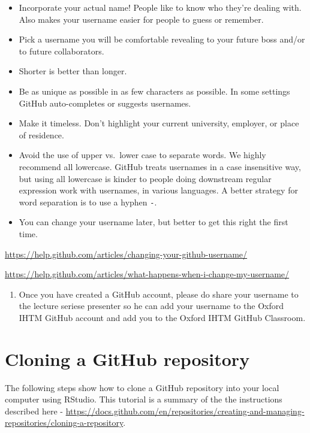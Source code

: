\documentclass[
  12pt,
]{book}
\providecommand{\tightlist}{%
  \setlength{\itemsep}{0pt}\setlength{\parskip}{0pt}}
\begin{document}
\begin{itemize}
\item
  Incorporate your actual name! People like to know who they're dealing with. Also makes your username easier for people to guess or remember.
\item
  Pick a username you will be comfortable revealing to your future boss and/or to future collaborators.
\item
  Shorter is better than longer.
\item
  Be as unique as possible in as few characters as possible. In some settings GitHub auto-completes or suggests usernames.
\item
  Make it timeless. Don't highlight your current university, employer, or place of residence.
\item
  Avoid the use of upper vs.~lower case to separate words. We highly recommend all lowercase. GitHub treats usernames in a case insensitive way, but using all lowercase is kinder to people doing downstream regular expression work with usernames, in various languages. A better strategy for word separation is to use a hyphen \texttt{-}.
\item
  You can change your username later, but better to get this right the first time.
\end{itemize}

\url{https://help.github.com/articles/changing-your-github-username/}

\url{https://help.github.com/articles/what-happens-when-i-change-my-username/}

\begin{enumerate}
\def\labelenumi{\arabic{enumi}.}
\setcounter{enumi}{5}
\tightlist
\item
  Once you have created a GitHub account, please do share your username to the lecture seriese presenter so he can add your username to the Oxford IHTM GitHub account and add you to the Oxford IHTM GitHub Classroom.
\end{enumerate}

\hypertarget{clone-repository}{%
\chapter{Cloning a GitHub repository}\label{clone-repository}}

The following steps show how to clone a GitHub repository into your local computer using RStudio. This tutorial is a summary of the the instructions described here - \url{https://docs.github.com/en/repositories/creating-and-managing-repositories/cloning-a-repository}.
\end{document}
